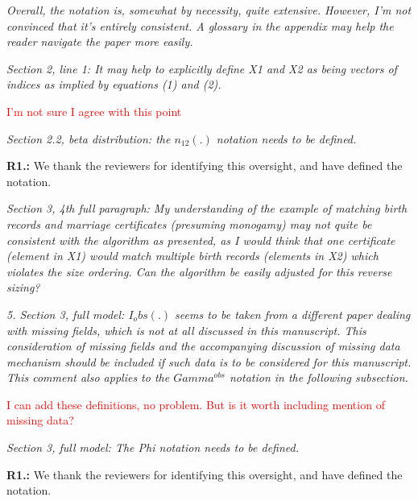 \documentclass[letterpaper, parskip]{scrartcl}
\newcommand{\pointRaised}[1]{%
	\begin{tcolorbox}
		\itshape #1
	\end{tcolorbox}
}
\newcounter{responsectr}[section]     %
\newcommand{\reply}[2]{%
	\refstepcounter{responsectr}%
	\textbf{#1.\theresponsectr:} #2
}
\begin{document}
		\pointRaised{%
Overall, the notation is, somewhat by necessity, quite extensive. However, I’m not convinced that it’s entirely consistent. A glossary in the appendix may help the reader navigate the paper more easily.
	}

		\pointRaised{%
Section 2, line 1: It may help to explicitly define X1 and X2 as being vectors of indices as implied
by equations (1) and (2).
}
\textcolor{red}{I'm not sure I agree with this point}

		\pointRaised{%
Section 2.2, beta distribution: the $n_{12}(.)$ notation needs to be defined.
}
		\reply{R1}{%
			We thank the reviewers for identifying this oversight, and have defined the notation. 
		}

		\pointRaised{%
Section 3, 4th full paragraph: My understanding of the example of matching birth records and
marriage certificates (presuming monogamy) may not quite be consistent with the algorithm as
presented, as I would think that one certificate (element in X1) would match multiple birth
records (elements in X2) which violates the size ordering. Can the algorithm be easily adjusted
for this reverse sizing?
}

\color{red}{I need some help addressing this in the paper. The answer is yes, the algorithm can easily be adapted for the reverse sizing. The issue is mostly notational. 

It seems as though Sadinle chose to label the datasets $X_1$ and $X_2$ such that $n_1 > n_2$ for mostly notational reasons. He uses the notation $Z_j = n_1 + j$ when record $j \in X_1$ has no match in $X_2$, which works because when $n_1 > n_2$, $n_1 + j$ never refers to any record in $X_2$. Jody uses the simplified notation $Z_j = n_1 + 1$ to refer to unmatched records, and this works for the same reason. 

However, when we relax the one-to-one constraint, or even encourage a modeller to allow multiple linkages in one dataset, we shouldn't denote the datasets according to simple notational convenience. This might require clever edits of the "Review of Prior Work" section, and other areas of the paper. 

Notationally, we can use  $Z_j = 0$ or $Z_j = -j$ as a way to unambiguously denote a record as nonmatching.

Additionally, we could just strike the paragraph about the advantages of many-to-one matchings, and keep this strictly a paper about bipartite matching}

		\pointRaised{%
5. Section 3, full model: $I_obs(.)$ seems to be taken from a different paper dealing with missing
fields, which is not at all discussed in this manuscript. This consideration of missing fields and
the accompanying discussion of missing data mechanism should be included if such data is to be
considered for this manuscript. This comment also applies to the $Gamma^{obs}$ notation in the
following subsection.
}
\textcolor{red}{I can add these definitions, no problem. But is it worth including mention of missing data?}
		\pointRaised{%
Section 3, full model: The Phi notation needs to be defined.
}
		\reply{R1}{%
	We thank the reviewers for identifying this oversight, and have defined the notation. 
}
\end{document}
